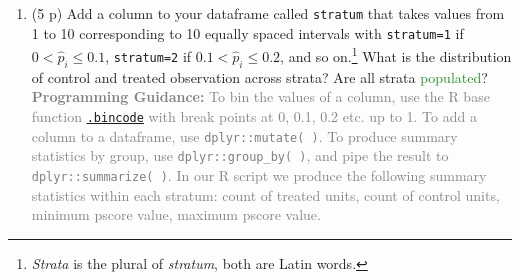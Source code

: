 \documentclass[
]{article}
\newenvironment{Shaded}{\begin{snugshade}}{\end{snugshade}}
\newcommand{\AttributeTok}[1]{\textcolor[rgb]{0.13,0.29,0.53}{#1}}
\newcommand{\DecValTok}[1]{\textcolor[rgb]{0.00,0.00,0.81}{#1}}
\newcommand{\FloatTok}[1]{\textcolor[rgb]{0.00,0.00,0.81}{#1}}
\newcommand{\FunctionTok}[1]{\textcolor[rgb]{0.13,0.29,0.53}{\textbf{#1}}}
\newcommand{\NormalTok}[1]{#1}
\newcommand{\OtherTok}[1]{\textcolor[rgb]{0.56,0.35,0.01}{#1}}
\newcommand{\SpecialCharTok}[1]{\textcolor[rgb]{0.81,0.36,0.00}{\textbf{#1}}}
\providecommand{\tightlist}{%
  \setlength{\itemsep}{0pt}\setlength{\parskip}{0pt}}
\begin{document}
\begin{enumerate}
\def\labelenumi{\alph{enumi}.}
\tightlist
\item
  (5 p) Add a column to your dataframe called \texttt{stratum} that
  takes values from 1 to 10 corresponding to 10 equally spaced intervals
  with \texttt{stratum=1} if \(0<\widehat{p}_{i}\leq 0.1\),
  \texttt{stratum=2} if \(0.1<\widehat{p}_{i}\leq 0.2\), and so
  on.\footnote{\textit{Strata} is the plural of \textit{stratum}, both are Latin words.}
  What is the distribution of control and treated observation across
  strata? Are all strata \textcolor{ForestGreen}{populated}?
  \textcolor{gray}{\textbf{Programming Guidance:} To bin the values of a column, use the R base function \href{https://www.rdocumentation.org/packages/base/versions/3.6.2/topics/.bincode( )}{\texttt{.bincode}} with break points at 0, 0.1, 0.2 etc. up to 1. To add a column to a dataframe, use \texttt{dplyr::mutate( )}. To produce summary statistics by group, use \texttt{dplyr::group\_by( )}, and pipe the result to \texttt{dplyr::summarize( )}. In our R script we produce the following summary statistics within each stratum: count of treated units, count of control units, minimum pscore value, maximum pscore value.}
\end{enumerate}

\begin{Shaded}
\end{Shaded}
\end{document}
